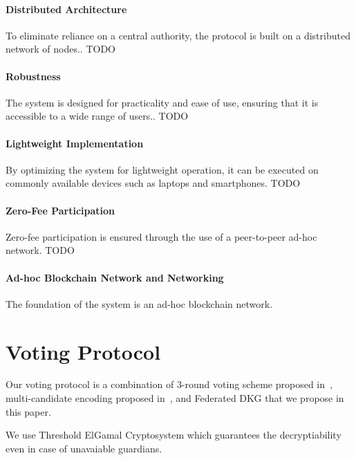 \documentclass{article}
\begin{document}
\paragraph{Distributed Architecture}
To eliminate reliance on a central authority, the protocol is built on a distributed network of nodes.. TODO

\paragraph{Robustness}
The system is designed for practicality and ease of use, ensuring that it is accessible to a wide range of users.. TODO

\paragraph{Lightweight Implementation}
By optimizing the system for lightweight operation, it can be executed on commonly available devices such as laptops and smartphones. TODO

\paragraph{Zero-Fee Participation}
Zero-fee participation is ensured through the use of a peer-to-peer ad-hoc network. TODO

\paragraph{Ad-hoc Blockchain Network and Networking}
The foundation of the system is an ad-hoc blockchain network.


\section{Voting Protocol}
Our voting protocol is a combination of 3-round voting scheme proposed in~\cite{schoenmakersLectureNotesCryptographic2018}, multi-candidate encoding proposed in~\cite{haoAnonymousVotingTworound2010}, and Federated DKG that we propose in this paper. 

We use Threshold ElGamal Cryptosystem which guarantees the decryptiability even in case of unavaiable guardians.
\end{document}
